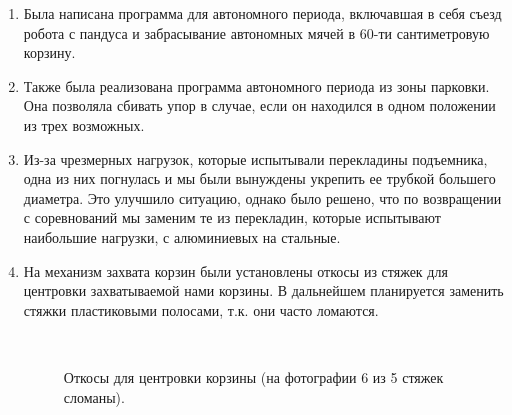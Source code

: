 \begin{enumerate}
	\item Была написана программа для автономного периода, включавшая в себя съезд робота с пандуса и забрасывание автономных мячей в 60-ти сантиметровую корзину.
	
	\item Также была реализована программа автономного периода из зоны парковки. Она позволяла сбивать упор в случае, если он находился в одном положении из трех возможных.
	
	\item Из-за чрезмерных нагрузок, которые испытывали перекладины подъемника, одна из них погнулась и мы были вынуждены укрепить ее трубкой большего диаметра. Это улучшило ситуацию, однако было решено, что по возвращении с соревнований мы заменим те из перекладин, которые испытывают наибольшие нагрузки, с алюминиевых на стальные.
	
	
	\item На механизм захвата корзин были установлены откосы из стяжек для центровки захватываемой нами корзины. В дальнейшем планируется заменить стяжки  пластиковыми полосами, т.к. они часто ломаются.
	
	\begin{figure}[H]
		\begin{minipage}[h]{0.2\linewidth}
			\center  
		\end{minipage}
		\begin{minipage}[h]{0.6\linewidth}
			\caption{Откосы для центровки корзины (на фотографии 6 из 5 стяжек сломаны).}
		\end{minipage}
	\end{figure}
	

\end{enumerate}
